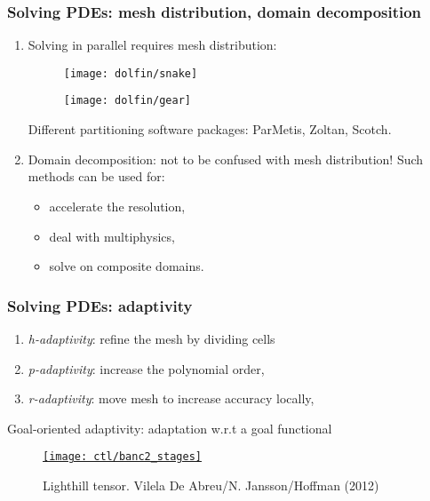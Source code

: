 \begin{frame}
  \frametitle{Solving PDEs: mesh distribution, domain decomposition}

\begin{enumerate}
\item Solving in parallel requires mesh distribution:
\begin{center}
   \begin{minipage}[bc]{0.3\linewidth}
   \centering
   \begin{figure}
    \centering
    \texttt{[image: dolfin/snake]}
\end{figure}
   \end{minipage}
   \begin{minipage}[bc]{0.3\linewidth}
   \centering
   \begin{figure}
    \centering
    \texttt{[image: dolfin/gear]}
    \end{figure}
   \end{minipage}
\end{center}
Different partitioning software packages: ParMetis, Zoltan, Scotch.

\bigskip
\item Domain decomposition: not to be confused with mesh distribution! Such methods can be used for:
\begin{itemize}
\item accelerate the resolution,
\item deal with multiphysics,
\item solve on composite domains.
\end{itemize}

\end{enumerate}
\end{frame}

\begin{frame}
  \frametitle{Solving PDEs: adaptivity}

\begin{enumerate}
\item \textit{h-adaptivity}: refine the mesh by dividing cells
\item \textit{p-adaptivity}: increase the polynomial order,
\item \textit{r-adaptivity}: move mesh to increase accuracy locally,
\end{enumerate}

\medskip
Goal-oriented adaptivity: adaptation w.r.t a goal functional
\begin{figure}[hbt]
  \centering
  \href{run:\figs/ctl/banc2.mp4}{\texttt{[image: ctl/banc2\_stages]}}
  \caption{Lighthill tensor. Vilela De Abreu/N. Jansson/Hoffman (2012)}
\end{figure}

\end{frame}

